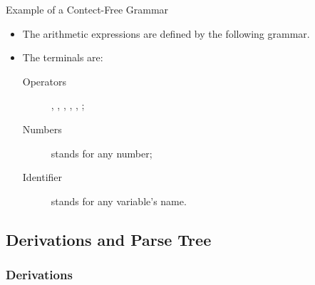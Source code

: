\begin{bibunit}[apalike]
\begin{frame}[fragile]{Example of a Contect-Free Grammar}
	\begin{itemize}
	\item The arithmetic expressions are defined by the following grammar.
	\vfill
	\item The terminals are: \begin{description}
		\item[Operators] \code{+}, \code{-}, \code{*}, \code{/}, \code{(}, \code{)};
		\item[Numbers]  stands for any number;
		\item[Identifier]  stands for any variable's name.
		\end{description}
	\end{itemize}
	\vfill
	\begin{small}
	\begin{bnf}
	\end{bnf}
	\end{small}
\end{frame}

\subsection{Derivations and Parse Tree}

\tableofcontentslide[sections={1-3},sectionstyle={show/shaded},subsectionstyle={show/shaded/hide},subsubsectionstyle={show/show/hide/hide}]

\subsubsection{Derivations}


\end{bibunit}
